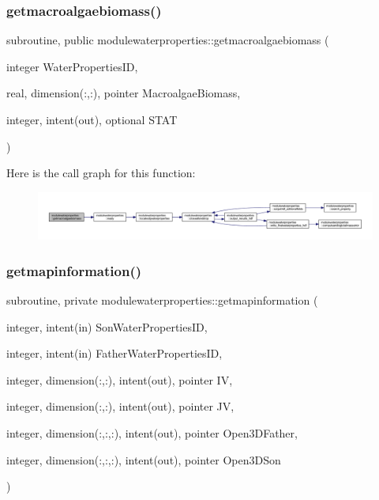 \subsubsection{\texorpdfstring{getmacroalgaebiomass()}{getmacroalgaebiomass()}}
{\footnotesize\ttfamily subroutine, public modulewaterproperties\+::getmacroalgaebiomass (\begin{DoxyParamCaption}\item[{integer}]{Water\+Properties\+ID,  }\item[{real, dimension(\+:,\+:), pointer}]{Macroalgae\+Biomass,  }\item[{integer, intent(out), optional}]{S\+T\+AT }\end{DoxyParamCaption})}

Here is the call graph for this function\+:\nopagebreak
\begin{figure}[H]
\begin{center}
\leavevmode
\includegraphics[width=350pt]{namespacemodulewaterproperties_a786f352ede780fcaec30c57d6653f0f1_cgraph}
\end{center}
\end{figure}
\mbox{\label{namespacemodulewaterproperties_a1b70dbb2ea91a797c991fcc031837095}} 
\subsubsection{\texorpdfstring{getmapinformation()}{getmapinformation()}}
{\footnotesize\ttfamily subroutine, private modulewaterproperties\+::getmapinformation (\begin{DoxyParamCaption}\item[{integer, intent(in)}]{Son\+Water\+Properties\+ID,  }\item[{integer, intent(in)}]{Father\+Water\+Properties\+ID,  }\item[{integer, dimension(\+:,\+:), intent(out), pointer}]{IV,  }\item[{integer, dimension(\+:,\+:), intent(out), pointer}]{JV,  }\item[{integer, dimension(\+:,\+:,\+:), intent(out), pointer}]{Open3\+D\+Father,  }\item[{integer, dimension(\+:,\+:,\+:), intent(out), pointer}]{Open3\+D\+Son }\end{DoxyParamCaption})\hspace{0.3cm}{\ttfamily [private]}}

